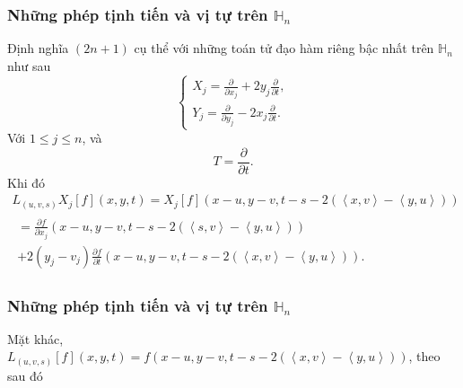 \documentclass[11pt]{beamer}
\numberwithin{equation}{section}
\theoremstyle{plain}
\theoremstyle{definition}
\theoremstyle{remark}
\begin{document}
\begin{frame}\frametitle{Những phép tịnh tiến và vị tự trên $\mathbb{H}_{n}$}
Định nghĩa $\left(2n+1\right)$ cụ thể với những toán tử đạo hàm riêng bậc nhất trên $\mathbb{H}_n$ như sau
\[\left\{ \begin{array}{l}
{X_j} = \frac{\partial }{{\partial {x_j}}} + 2{y_j}\frac{\partial }{{\partial t}},\\
{Y_j} = \frac{\partial }{{\partial {y_j}}} - 2{x_j}\frac{\partial }{{\partial t}}.
\end{array} \right.\]
Với $1\le j\le n$, và 
\[T = \frac{\partial }{{\partial t}}.\]
Khi đó
\[\begin{array}{*{20}{l}}
{{L_{\left( {u,v,s} \right)}}{X_j}\left[ f \right]\left( {x,y,t} \right) = {X_j}\left[ f \right]\left( {x - u,y - v,t - s - 2\left( {\left\langle {x,v} \right\rangle  - \left\langle {y,u} \right\rangle } \right)} \right)}\\
\begin{array}{l}
 = \frac{{\partial f}}{{\partial {x_j}}}\left( {x - u,y - v,t - s - 2\left( {\left\langle {s,v} \right\rangle  - \left\langle {y,u} \right\rangle } \right)} \right)\\
 + 2\left( {{y_j} - {v_j}} \right)\frac{{\partial f}}{{\partial t}}\left( {x - u,y - v,t - s - 2\left( {\left\langle {x,v} \right\rangle  - \left\langle {y,u} \right\rangle } \right)} \right).
\end{array}
\end{array}\]
\end{frame}

\begin{frame}\frametitle{Những phép tịnh tiến và vị tự trên $\mathbb{H}_{n}$}
Mặt khác, ${L_{\left( {u,v,s} \right)}}\left[ f \right]\left( {x,y,t} \right) = f\left( {x - u,y - v,t - s - 2\left( {\left\langle {x,v} \right\rangle  - \left\langle {y,u} \right\rangle } \right)} \right)$, theo sau đó
\end{frame}
\end{document}
